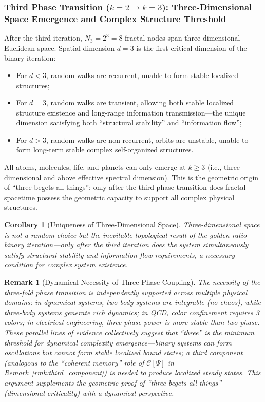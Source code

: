 \documentclass[12pt,a4paper,twocolumn]{article}
\newtheorem{corollary}[theorem]{Corollary}
\newtheorem{remark}[theorem]{Remark}
\begin{document}
\subsubsection{Third Phase Transition ($k=2\to k=3$): Three-Dimensional Space Emergence and Complex Structure Threshold}
After the third iteration, $N_3=2^3=8$ fractal nodes span three-dimensional Euclidean space. Spatial dimension $d=3$ is the first critical dimension of the binary iteration:
\begin{itemize}
\item For $d<3$, random walks are recurrent, unable to form stable localized structures;
\item For $d=3$, random walks are transient, allowing both stable localized structure existence and long-range information transmission---the unique dimension satisfying both ``structural stability'' and ``information flow'';
\item For $d>3$, random walks are non-recurrent, orbits are unstable, unable to form long-term stable complex self-organized structures.
\end{itemize}
All atoms, molecules, life, and planets can only emerge at $k\geq3$ (i.e., three-dimensional and above effective spectral dimension). This is the geometric origin of ``three begets all things'': only after the third phase transition does fractal spacetime possess the geometric capacity to support all complex physical structures.

\begin{corollary}[Uniqueness of Three-Dimensional Space]
Three-dimensional space is not a random choice but the inevitable topological result of the golden-ratio binary iteration---only after the third iteration does the system simultaneously satisfy structural stability and information flow requirements, a necessary condition for complex system existence.
\end{corollary}

\begin{remark}[Dynamical Necessity of Three-Phase Coupling]
\label{rmk:three_phase_necessity}
The necessity of the three-fold phase transition is independently supported across multiple physical domains: in dynamical systems, two-body systems are integrable (no chaos), while three-body systems generate rich dynamics; in QCD, color confinement requires 3 colors; in electrical engineering, three-phase power is more stable than two-phase. These parallel lines of evidence collectively suggest that ``three'' is the minimum threshold for dynamical complexity emergence---binary systems can form oscillations but cannot form stable localized bound states; a third component (analogous to the ``coherent memory'' role of $\mathcal{C}[\Psi]$ in Remark~\ref{rmk:third_component}) is needed to produce localized steady states. This argument supplements the geometric proof of ``three begets all things'' (dimensional criticality) with a dynamical perspective.
\end{remark}
\end{document}
